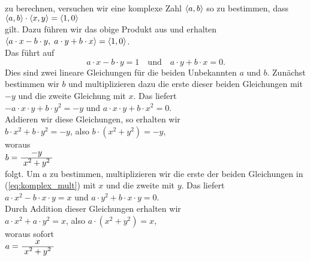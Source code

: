 zu berechnen, versuchen wir eine komplexe Zahl $\pair(a,b)$ so zu bestimmen, dass
\\[0.2cm]
\hspace*{1.3cm} $\pair(a,b) \cdot \pair(x,y) = \pair(1,0)$
\\[0.2cm]
gilt.  Dazu f\"{u}hren wir das obige Produkt aus und erhalten
\\[0.2cm]
\hspace*{1.3cm} $\pair(a \cdot x - b \cdot y,\; a \cdot y + b \cdot x) = \pair(1,0)$.
\\[0.2cm]
Das f\"{u}hrt auf 
\begin{equation}
  \label{eq:komplex_mult}  
 a \cdot x - b \cdot y = 1 \quad \mbox{und} \quad a \cdot y + b \cdot x = 0.
\end{equation}
Dies sind zwei lineare Gleichungen f\"{u}r die beiden Unbekannten $a$ und $b$.  Zun\"{a}chst bestimmen wir
$b$ und multiplizieren dazu die erste dieser beiden Gleichungen mit $-y$ und die zweite Gleichung mit $x$.  Das
liefert
\\[0.2cm]
\hspace*{1.3cm} 
$-a \cdot x \cdot y + b \cdot y^2 = -y$ \quad und \quad $a \cdot x \cdot y + b \cdot
x^2 = 0$.
\\[0.2cm]
Addieren wir diese Gleichungen, so erhalten wir
\\[0.2cm]
\hspace*{1.3cm} 
$b \cdot x^2 + b \cdot y^2 = -y$, \quad also \quad
$b \cdot (x^2 + y^2) = -y$,
\\[0.2cm]
woraus
\\[0.2cm]
\hspace*{1.3cm} $b = \bruch{-y}{x^2 + y^2}$
\\[0.2cm]
folgt.  Um $a$ zu bestimmen, multiplizieren wir die erste der beiden Gleichungen in
(\ref{eq:komplex_mult}) mit $x$ und die zweite mit $y$.  Das liefert
\\[0.2cm]
\hspace*{1.3cm}
$a \cdot x^2 - b \cdot x \cdot y = x$ \quad und \quad $a \cdot y^2 + b \cdot x \cdot y = 0$.
\\[0.2cm]
Durch Addition dieser Gleichungen erhalten wir
\\[0.2cm]
\hspace*{1.3cm}
$a \cdot x^2 + a \cdot y^2 = x$, \quad also \quad $a \cdot (x^2 + y^2) = x$,
\\[0.2cm]
woraus sofort
\\[0.2cm]
\hspace*{1.3cm}
$a = \bruch{x}{x^2 + y^2}$
\\[0.2cm]
